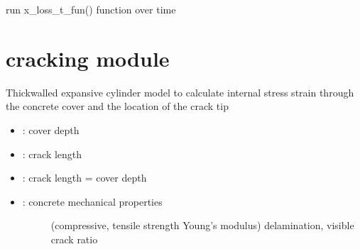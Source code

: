 \documentclass[letterpaper,10pt,english]{sphinxmanual}
\begin{document}

\begin{fulllineitems}
\label{\detokenize{corrosion:corrosion.x_loss_year}}
\sphinxAtStartPar
run x\_loss\_t\_fun() function over time

\end{fulllineitems}



\section{cracking module}
\label{\detokenize{cracking:module-cracking}}\label{\detokenize{cracking:cracking-module}}\label{\detokenize{cracking::doc}}
\sphinxAtStartPar
{}

\sphinxAtStartPar
Thick\sphinxhyphen{}walled expansive cylinder model to calculate internal
stress strain through the concrete cover and the location of the crack tip
\begin{itemize}
\item {} 
\sphinxAtStartPar
{}:       cover depth

\item {} 
\sphinxAtStartPar
{}:             crack length

\item {} 
\sphinxAtStartPar
{}:      crack length = cover depth

\item {} \begin{description}
\item[{:       concrete mechanical properties}] \leavevmode
\sphinxAtStartPar
(compressive, tensile strength Young’s modulus)
delamination, visible crack ratio

\end{description}

\end{itemize}
\end{document}
